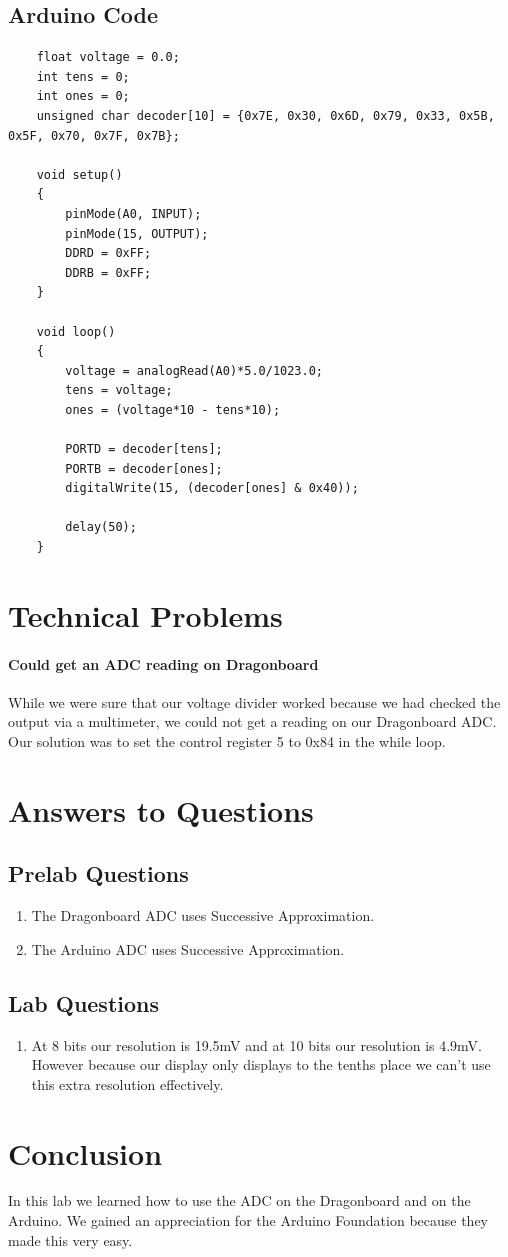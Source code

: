 \documentclass{article}
\begin{document}
	\subsection*{Arduino Code}
	\begin{lstlisting}
	float voltage = 0.0;
	int tens = 0;
	int ones = 0;
	unsigned char decoder[10] = {0x7E, 0x30, 0x6D, 0x79, 0x33, 0x5B, 0x5F, 0x70, 0x7F, 0x7B};
		
	void setup() 
	{
		pinMode(A0, INPUT);
		pinMode(15, OUTPUT);
		DDRD = 0xFF;
		DDRB = 0xFF;
	}
		
	void loop() 
	{
		voltage = analogRead(A0)*5.0/1023.0;
		tens = voltage;
		ones = (voltage*10 - tens*10);
		
		PORTD = decoder[tens];
		PORTB = decoder[ones];
		digitalWrite(15, (decoder[ones] & 0x40));
		
		delay(50);
	}
	\end{lstlisting}
	\section*{Technical Problems}
	\paragraph*{Could get an ADC reading on Dragonboard}
	While we were sure that our voltage divider worked because we had checked the output via a multimeter, we could not get a reading on our Dragonboard ADC. Our solution was to set the control register 5 to 0x84 in the while loop.
	\section*{Answers to Questions}
	\subsection*{Prelab Questions}
	\begin{enumerate}
		\item The Dragonboard ADC uses Successive Approximation.
		\item The Arduino ADC uses Successive Approximation.
	\end{enumerate}
	\subsection*{Lab Questions}
	\begin{enumerate}
		\item At 8 bits our resolution is 19.5mV and at 10 bits our resolution is 4.9mV. However because our display only displays to the tenths place we can't use this extra resolution effectively.
	\end{enumerate}
	\section*{Conclusion}
	In this lab we learned how to use the ADC on the Dragonboard and on the Arduino. We gained an appreciation for the Arduino Foundation because they made this very easy. 
\end{document}
